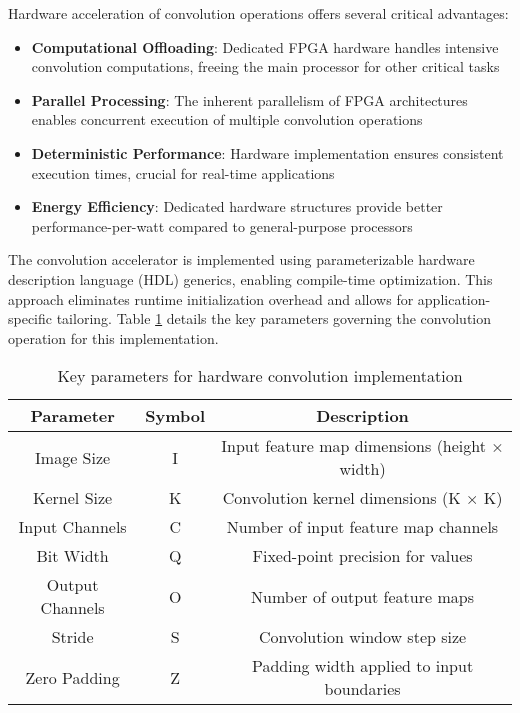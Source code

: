 Hardware acceleration of convolution operations offers several critical advantages:

\begin{itemize}
    \item \textbf{Computational Offloading}: Dedicated FPGA hardware handles intensive convolution computations, freeing the main processor for other critical tasks
    \item \textbf{Parallel Processing}: The inherent parallelism of FPGA architectures enables concurrent execution of multiple convolution operations
    \item \textbf{Deterministic Performance}: Hardware implementation ensures consistent execution times, crucial for real-time applications
    \item \textbf{Energy Efficiency}: Dedicated hardware structures provide better performance-per-watt compared to general-purpose processors
\end{itemize}

The convolution accelerator is implemented using parameterizable hardware description language (HDL) generics, enabling compile-time optimization. This approach eliminates runtime initialization overhead and allows for application-specific tailoring. Table \ref{tab:convolution_parameters} details the key parameters governing the convolution operation for this implementation.

\begin{table}[h!]
    \centering
    \caption{Key parameters for hardware convolution implementation}
    \label{tab:convolution_parameters}
    \begin{tabular}{ccc}
        \toprule
        Parameter & Symbol & Description \\
        \midrule
        Image Size & I & Input feature map dimensions (height × width) \\
        Kernel Size & K & Convolution kernel dimensions (K × K) \\
        Input Channels & C & Number of input feature map channels \\
        Bit Width & Q & Fixed-point precision for values \\
        Output Channels & O & Number of output feature maps \\
        Stride & S & Convolution window step size \\
        Zero Padding & Z & Padding width applied to input boundaries \\
        \bottomrule
    \end{tabular}
\end{table}

